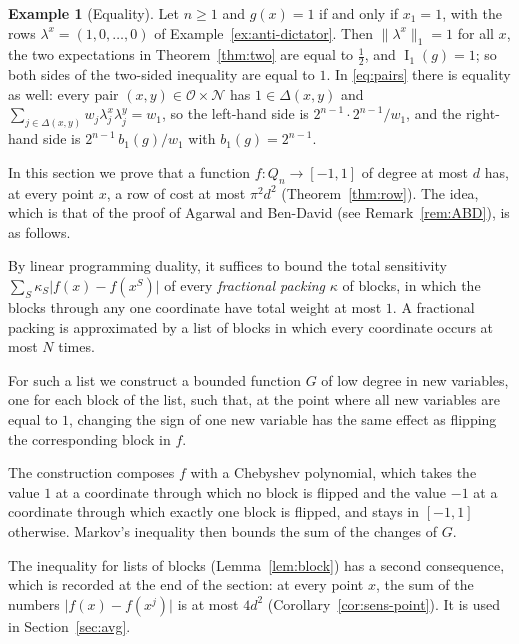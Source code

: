 \documentclass[11pt,reqno]{amsart}
\makeatletter
\theoremstyle{definition}
\newtheorem{example}[theorem]{Example}
\theoremstyle{remark}
\numberwithin{equation}{section}
\theoremstyle{named}
\theoremstyle{plain}
\renewcommand{\section}{\@startsection{section}{1}%
  \z@{1.3\linespacing\@plus.7\linespacing}{.65\linespacing}{\normalfont\scshape\centering}}
\newcommand{\I}{\operatorname{I}}
\newcommand{\cO}{\mathcal{O}}
\newcommand{\cN}{\mathcal{N}}
\newcommand{\norm}[1]{\lVert #1\rVert_1}
\newcommand{\abs}[1]{\lvert #1\rvert}
\makeatother
\begin{document}
\begin{example}[Equality]\label{ex:dictator}
Let $n\ge1$ and $g(x)=1$ if and only if $x_1=1$, with the rows $\lambda^{x}=(1,0,\dots,0)$
of Example~\ref{ex:anti-dictator}. Then $\norm{\lambda^{x}}=1$ for all $x$, the two expectations in
Theorem~\ref{thm:two} are equal to $\frac12$, and $\I_1(g)=1$; so both sides of the two-sided
inequality are equal to $1$. In \eqref{eq:pairs} there is equality as well: every pair
$(x,y)\in\cO\times\cN$ has $1\in\Delta(x,y)$ and
$\sum_{j\in\Delta(x,y)}w_j\lambda^{x}_j\lambda^{y}_j=w_1$, so the left-hand side is
$2^{n-1}\cdot2^{n-1}/w_1$, and the right-hand side is $2^{n-1}\,b_1(g)/w_1$ with $b_1(g)=2^{n-1}$.
\end{example}

\section{The row bound}\label{sec:row}

In this section we prove that a function $f\colon Q_n\to[-1,1]$ of degree at most $d$ has, at every
point $x$, a row of cost at most $\pi^{2}d^{2}$ (Theorem~\ref{thm:row}). The idea, which is that of the
proof of Agarwal and Ben-David \cite{ABD} (see Remark~\ref{rem:ABD}), is as follows.

By linear programming
duality, it suffices to bound the total sensitivity $\sum_S\kappa_S\abs{f(x){-}f(x^{S})}$ of every
\emph{fractional packing} $\kappa$ of blocks, in which the blocks through any one coordinate have total
weight at most $1$. A fractional packing is approximated by a list of blocks in which every coordinate
occurs at most $N$ times.

For such a list we construct a bounded function $G$ of low degree in new
variables, one for each block of the list, such that, at the point where all new variables are equal
to $1$, changing the sign of one new variable has the same effect as flipping the corresponding block
in $f$.

The construction composes $f$ with a Chebyshev
polynomial, which takes the value $1$ at a coordinate through which no block is flipped and the value
$-1$ at a coordinate through which exactly one block is flipped, and stays in $[-1,1]$ otherwise.
Markov's inequality then bounds the sum of the changes of $G$.

The inequality for lists of blocks (Lemma~\ref{lem:block}) has a second consequence, which is
recorded at the end of the section: at every point $x$, the sum of the numbers
$\abs{f(x)-f(x^{j})}$ is at most $4d^{2}$ (Corollary~\ref{cor:sens-point}). It is used in
Section~\ref{sec:avg}.
\end{document}

